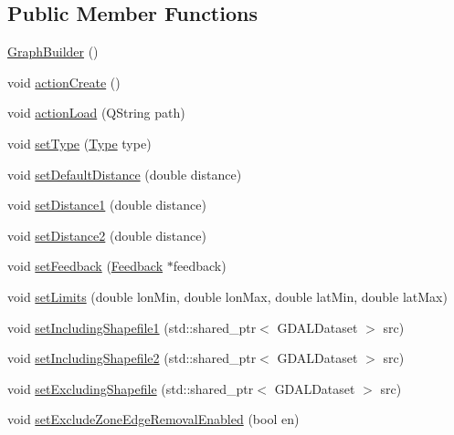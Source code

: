 \subsection*{Public Member Functions}
\begin{DoxyCompactItemize}
\item 
\mbox{\hyperlink{class_graph_builder_a5acd0216d1c0a8818a68dfc2600c8628}{Graph\+Builder}} ()
\item 
void \mbox{\hyperlink{class_graph_builder_a0267a71181ae3287eff6366c97c1c913}{action\+Create}} ()
\item 
void \mbox{\hyperlink{class_graph_builder_a2f666b3f1cecac293929bbd9a52d7b28}{action\+Load}} (Q\+String path)
\item 
void \mbox{\hyperlink{class_graph_builder_a939a4b50dd99194d3f892716ad67c997}{set\+Type}} (\mbox{\hyperlink{class_graph_builder_ad9125786780ea834b0368c7a599bb5d9}{Type}} type)
\item 
void \mbox{\hyperlink{class_graph_builder_a19e3a9bea0d7ce5a652282e91959dd19}{set\+Default\+Distance}} (double distance)
\item 
void \mbox{\hyperlink{class_graph_builder_a5d2fca10989ba993e67a41a0ee5c05e5}{set\+Distance1}} (double distance)
\item 
void \mbox{\hyperlink{class_graph_builder_a327ec74b0d914e47990ab9b648da360f}{set\+Distance2}} (double distance)
\item 
void \mbox{\hyperlink{class_graph_builder_a8ac3fc8065e31de18505cd536514a0cc}{set\+Feedback}} (\mbox{\hyperlink{class_graph_builder_1_1_feedback}{Feedback}} $\ast$feedback)
\item 
void \mbox{\hyperlink{class_graph_builder_a2cf6d3a1f623f8a1d6e6bf9aa805db83}{set\+Limits}} (double lon\+Min, double lon\+Max, double lat\+Min, double lat\+Max)
\item 
void \mbox{\hyperlink{class_graph_builder_a6636a000453573bf0766b61ac4ab125f}{set\+Including\+Shapefile1}} (std\+::shared\+\_\+ptr$<$ G\+D\+A\+L\+Dataset $>$ src)
\item 
void \mbox{\hyperlink{class_graph_builder_a422365e22c97d9c30bab2323b9ef3a3f}{set\+Including\+Shapefile2}} (std\+::shared\+\_\+ptr$<$ G\+D\+A\+L\+Dataset $>$ src)
\item 
void \mbox{\hyperlink{class_graph_builder_aebff2d996af115468401b969b224b10e}{set\+Excluding\+Shapefile}} (std\+::shared\+\_\+ptr$<$ G\+D\+A\+L\+Dataset $>$ src)
\item 
void \mbox{\hyperlink{class_graph_builder_ac0ac7fbceaf5ccfc58ab7040ecd4253e}{set\+Exclude\+Zone\+Edge\+Removal\+Enabled}} (bool en)

\end{DoxyCompactItemize}
